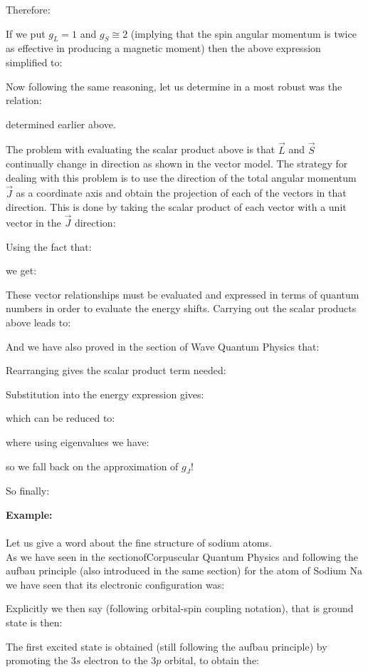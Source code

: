 	Therefore:
	
	If we put $g_L=1$ and $g_S\cong 2$ (implying that the spin angular momentum is twice as effective in producing a magnetic moment) then the above expression simplified to:
	
	Now following the same reasoning, let us determine in a most robust was the relation:
	
	determined earlier above.
	
	The problem with evaluating the scalar product above is that $\vec{L}$ and $\vec{S}$ continually change in direction as shown in the vector model. The strategy for dealing with this problem is to use the direction of the total angular momentum $\vec{J}$ as a coordinate axis and obtain the projection of each of the vectors in that direction. This is done by taking the scalar product of each vector with a unit vector in the $\vec{J}$ direction:
	
	Using the fact that:
	
	we get:
	
	These vector relationships must be evaluated and expressed in terms of quantum numbers in order to evaluate the energy shifts. Carrying out the scalar products above leads to:
	
	And we have also proved in the section of Wave Quantum Physics that:
	
	Rearranging gives the scalar product term needed:
	
	Substitution into the energy expression gives:
	
	which can be reduced to:
	
	where using eigenvalues we have:
	
	so we fall back on the approximation of $g_J$!
	
	So finally:
	
	
	\begin{tcolorbox}[colframe=black,colback=white,sharp corners]
	\textbf{{\Large {}}Example:}\\\\
	Let us give a word about the fine structure of sodium atoms.\\
	
	As we have seen in the sectionofCorpuscular Quantum Physics and following the aufbau principle (also introduced in the same section) for the atom of Sodium $\mathrm{Na}$ we have seen that its electronic configuration was:
	
	Explicitly we then say (following orbital-spin coupling notation), that is ground state is then:
	
	The first excited state is obtained (still following the aufbau principle) by promoting the $3s$ electron to the $3p$ orbital, to obtain the:	
	\end{tcolorbox}
	
